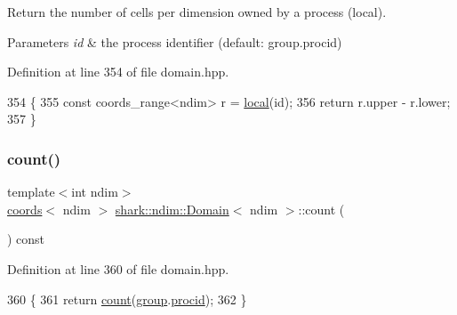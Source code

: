 Return the number of cells per dimension owned by a process (local). 
\begin{DoxyParams}{Parameters}
{\em id} & the process identifier (default\+: group.\+procid) \\
\hline
\end{DoxyParams}


Definition at line 354 of file domain.\+hpp.


\begin{DoxyCode}
354                                                             \{
355             \textcolor{keyword}{const} coords\_range<ndim> r = \hyperlink{classshark_1_1ndim_1_1_domain_a3351db56f9d6bd22ba473d744e3f7025}{local}(\textcolor{keywordtype}{id});
356             \textcolor{keywordflow}{return} r.upper - r.lower;
357         \}
\end{DoxyCode}
\hypertarget{classshark_1_1ndim_1_1_domain_ae35ca88c98731659785066a92c5def91}{}\label{classshark_1_1ndim_1_1_domain_ae35ca88c98731659785066a92c5def91} 
\subsubsection{\texorpdfstring{count()}{count()}\hspace{0.1cm}{\footnotesize\ttfamily [2/2]}}
{\footnotesize\ttfamily template$<$int ndim$>$ \\
\hyperlink{structshark_1_1ndim_1_1coords}{coords}$<$ ndim $>$ \hyperlink{classshark_1_1ndim_1_1_domain}{shark\+::ndim\+::\+Domain}$<$ ndim $>$\+::count (\begin{DoxyParamCaption}{ }\end{DoxyParamCaption}) const\hspace{0.3cm}{\ttfamily [inline]}}



Definition at line 360 of file domain.\+hpp.


\begin{DoxyCode}
360                                                       \{
361             \textcolor{keywordflow}{return} \hyperlink{classshark_1_1ndim_1_1_domain_ae35ca88c98731659785066a92c5def91}{count}(\hyperlink{classshark_1_1ndim_1_1_domain_a2bbf100371762ce405efd218bc1e3d0f}{group}.\hyperlink{classshark_1_1_group_af8c22a10243c3d05301280119b72c073}{procid});
362         \}
\end{DoxyCode}
\hypertarget{classshark_1_1ndim_1_1_domain_ad9cdf348ad0d1c8fe06965b3e9b3a5d0}{}\label{classshark_1_1ndim_1_1_domain_ad9cdf348ad0d1c8fe06965b3e9b3a5d0} 
